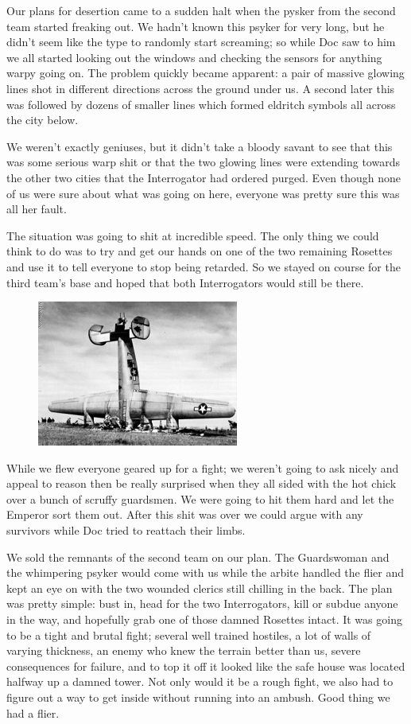 Our plans for desertion came to a sudden halt when the pysker from the second team started freaking out. 
We hadn’t known this psyker for very long, but he didn’t seem like the type to randomly start screaming; 
so while Doc saw to him we all started looking out the windows and checking the sensors for anything warpy going on. The problem quickly became apparent:
 a pair of massive glowing lines shot in different directions across the ground under us. 
A second later this was followed by dozens of smaller lines which formed eldritch symbols all across the city below.

We weren’t exactly geniuses, but it didn’t take a bloody savant to see that this was some serious warp shit or that the two glowing lines were extending towards the other two cities that the Interrogator had ordered purged. 
Even though none of us were sure about what was going on here, everyone was pretty sure this was all her fault. 

The situation was going to shit at incredible speed. 
The only thing we could think to do was to try and get our hands on one of the two remaining Rosettes and use it to tell everyone to stop being retarded. 
So we stayed on course for the third team’s base and hoped that both Interrogators would still be there.

\begin{figure}
	\begin{center}
		\includegraphics[width=\figwidth]{pics/5/28.png}
	\end{center}
\end{figure}
While we flew everyone geared up for a fight; 
we weren’t going to ask nicely and appeal to reason then be really surprised when they all sided with the hot chick over a bunch of scruffy guardsmen. 
We were going to hit them hard and let the Emperor sort them out. 
After this shit was over we could argue with any survivors while Doc tried to reattach their limbs.

We sold the remnants of the second team on our plan. 
The Guardswoman and the whimpering psyker would come with us while the arbite handled the flier and kept an eye on with the two wounded clerics still chilling in the back. 
The plan was pretty simple: bust in, head for the two Interrogators, kill or subdue anyone in the way, and hopefully grab one of those damned Rosettes intact. 
It was going to be a tight and brutal fight; 
several well trained hostiles, a lot of walls of varying thickness, an enemy who knew the terrain better than us, severe consequences for failure, and to top it off it looked like the safe house was located halfway up a damned tower. 
Not only would it be a rough fight, we also had to figure out a way to get inside without running into an ambush. 
Good thing we had a flier.


